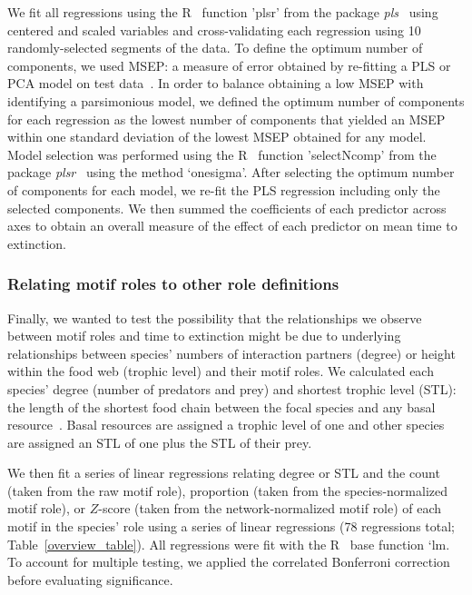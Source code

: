 \documentclass[12pt]{article}
\begin{document}
\begin{spacing}{2.0}
            We fit all regressions using the R~\citep{R} function 'plsr' from the package \emph{pls}~\citep{pls} using centered and scaled variables and cross-validating each regression using 10 randomly-selected segments of the data.
            To define the optimum number of components, we used MSEP: a measure of error obtained by re-fitting a PLS or PCA model on test data~\citep{Mevik2004}.
            In order to balance obtaining a low MSEP with identifying a parsimonious model, we defined the optimum number of components for each regression as the lowest number of components that yielded an MSEP~\citep{Mevik2004} within one standard deviation of the lowest MSEP obtained for any model.
			Model selection was performed using the R~\citep{R} function 'selectNcomp' from the package \emph{plsr}~\citep{pls} using the method `onesigma'.
			After selecting the optimum number of components for each model, we re-fit the PLS regression including only the selected components. 
			We then summed the coefficients of each predictor across axes to obtain an overall measure of the effect of each predictor on mean time to extinction.


		\subsubsection*{Relating motif roles to other role definitions}
		
			Finally, we wanted to test the possibility that the relationships we observe between motif roles and time to extinction might be due to underlying relationships between species' numbers of interaction partners (degree) or height within the food web (trophic level) and their motif roles.
			We calculated each species' degree (number of predators and prey) and shortest trophic level (STL): the length of the shortest food chain between the focal species and any basal resource~\citep{Hairston1993}. 
            Basal resources are assigned a trophic level of one and other species are assigned an STL of one plus the STL of their prey.
			

            We then fit a series of linear regressions relating degree or STL and the count (taken from the raw motif role), proportion (taken from the species-normalized motif role), or $Z$-score (taken from the network-normalized motif role) of each motif in the species' role using a series of linear regressions (78 regressions total; Table~\ref{overview_table}).
			All regressions were fit with the R~\citep{R} base function `lm.
            To account for multiple testing, we applied the correlated Bonferroni correction~\citep{Drezner2016} before evaluating significance.



\end{spacing}
\end{document}

